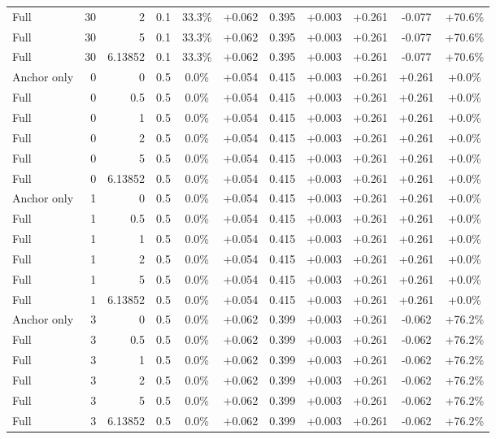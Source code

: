 \begin{table}[htbp]
\begin{tabular}{lrrrccccccc}
Full & 30 & 2 & 0.1 & 33.3\% & +0.062 & 0.395 & +0.003 & +0.261 & -0.077 & +70.6\% \\
Full & 30 & 5 & 0.1 & 33.3\% & +0.062 & 0.395 & +0.003 & +0.261 & -0.077 & +70.6\% \\
Full & 30 & 6.13852 & 0.1 & 33.3\% & +0.062 & 0.395 & +0.003 & +0.261 & -0.077 & +70.6\% \\
Anchor only & 0 & 0 & 0.5 & 0.0\% & +0.054 & 0.415 & +0.003 & +0.261 & +0.261 & +0.0\% \\
Full & 0 & 0.5 & 0.5 & 0.0\% & +0.054 & 0.415 & +0.003 & +0.261 & +0.261 & +0.0\% \\
Full & 0 & 1 & 0.5 & 0.0\% & +0.054 & 0.415 & +0.003 & +0.261 & +0.261 & +0.0\% \\
Full & 0 & 2 & 0.5 & 0.0\% & +0.054 & 0.415 & +0.003 & +0.261 & +0.261 & +0.0\% \\
Full & 0 & 5 & 0.5 & 0.0\% & +0.054 & 0.415 & +0.003 & +0.261 & +0.261 & +0.0\% \\
Full & 0 & 6.13852 & 0.5 & 0.0\% & +0.054 & 0.415 & +0.003 & +0.261 & +0.261 & +0.0\% \\
Anchor only & 1 & 0 & 0.5 & 0.0\% & +0.054 & 0.415 & +0.003 & +0.261 & +0.261 & +0.0\% \\
Full & 1 & 0.5 & 0.5 & 0.0\% & +0.054 & 0.415 & +0.003 & +0.261 & +0.261 & +0.0\% \\
Full & 1 & 1 & 0.5 & 0.0\% & +0.054 & 0.415 & +0.003 & +0.261 & +0.261 & +0.0\% \\
Full & 1 & 2 & 0.5 & 0.0\% & +0.054 & 0.415 & +0.003 & +0.261 & +0.261 & +0.0\% \\
Full & 1 & 5 & 0.5 & 0.0\% & +0.054 & 0.415 & +0.003 & +0.261 & +0.261 & +0.0\% \\
Full & 1 & 6.13852 & 0.5 & 0.0\% & +0.054 & 0.415 & +0.003 & +0.261 & +0.261 & +0.0\% \\
Anchor only & 3 & 0 & 0.5 & 0.0\% & +0.062 & 0.399 & +0.003 & +0.261 & -0.062 & +76.2\% \\
Full & 3 & 0.5 & 0.5 & 0.0\% & +0.062 & 0.399 & +0.003 & +0.261 & -0.062 & +76.2\% \\
Full & 3 & 1 & 0.5 & 0.0\% & +0.062 & 0.399 & +0.003 & +0.261 & -0.062 & +76.2\% \\
Full & 3 & 2 & 0.5 & 0.0\% & +0.062 & 0.399 & +0.003 & +0.261 & -0.062 & +76.2\% \\
Full & 3 & 5 & 0.5 & 0.0\% & +0.062 & 0.399 & +0.003 & +0.261 & -0.062 & +76.2\% \\
Full & 3 & 6.13852 & 0.5 & 0.0\% & +0.062 & 0.399 & +0.003 & +0.261 & -0.062 & +76.2\% \\

\end{tabular}
\end{table}
